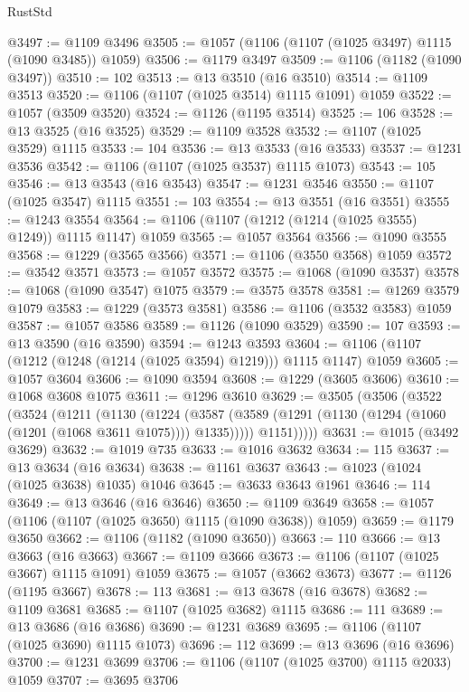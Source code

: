 \begin{lexlean}{RustStd}
\begin{coremodule}
@3497 := @1109 @3496
@3505 := @1057 (@1106 (@1107 (@1025 @3497) @1115 (@1090 @3485)) @1059)
@3506 := @1179 @3497
@3509 := @1106 (@1182 (@1090 @3497))
@3510 := 102
@3513 := @13 @3510 (@16 @3510)
@3514 := @1109 @3513
@3520 := @1106 (@1107 (@1025 @3514) @1115 @1091) @1059
@3522 := @1057 (@3509 @3520)
@3524 := @1126 (@1195 @3514)
@3525 := 106
@3528 := @13 @3525 (@16 @3525)
@3529 := @1109 @3528
@3532 := @1107 (@1025 @3529) @1115
@3533 := 104
@3536 := @13 @3533 (@16 @3533)
@3537 := @1231 @3536
@3542 := @1106 (@1107 (@1025 @3537) @1115 @1073)
@3543 := 105
@3546 := @13 @3543 (@16 @3543)
@3547 := @1231 @3546
@3550 := @1107 (@1025 @3547) @1115
@3551 := 103
@3554 := @13 @3551 (@16 @3551)
@3555 := @1243 @3554
@3564 := @1106 (@1107 (@1212 (@1214 (@1025 @3555) @1249)) @1115 @1147) @1059
@3565 := @1057 @3564
@3566 := @1090 @3555
@3568 := @1229 (@3565 @3566)
@3571 := @1106 (@3550 @3568) @1059
@3572 := @3542 @3571
@3573 := @1057 @3572
@3575 := @1068 (@1090 @3537)
@3578 := @1068 (@1090 @3547) @1075
@3579 := @3575 @3578
@3581 := @1269 @3579 @1079
@3583 := @1229 (@3573 @3581)
@3586 := @1106 (@3532 @3583) @1059
@3587 := @1057 @3586
@3589 := @1126 (@1090 @3529)
@3590 := 107
@3593 := @13 @3590 (@16 @3590)
@3594 := @1243 @3593
@3604 := @1106 (@1107 (@1212 (@1248 (@1214 (@1025 @3594) @1219))) @1115 @1147) @1059
@3605 := @1057 @3604
@3606 := @1090 @3594
@3608 := @1229 (@3605 @3606)
@3610 := @1068 @3608 @1075
@3611 := @1296 @3610
@3629 := @3505
    (@3506
      (@3522
        (@3524
          (@1211
            (@1130
              (@1224
                (@3587 (@3589 (@1291 (@1130 (@1294 (@1060 (@1201 (@1068 @3611 @1075)))) @1335)))))
              @1151)))))
@3631 := @1015 (@3492 @3629)
@3632 := @1019 @735
@3633 := @1016 @3632
@3634 := 115
@3637 := @13 @3634 (@16 @3634)
@3638 := @1161 @3637
@3643 := @1023 (@1024 (@1025 @3638) @1035) @1046
@3645 := @3633 @3643 @1961
@3646 := 114
@3649 := @13 @3646 (@16 @3646)
@3650 := @1109 @3649
@3658 := @1057 (@1106 (@1107 (@1025 @3650) @1115 (@1090 @3638)) @1059)
@3659 := @1179 @3650
@3662 := @1106 (@1182 (@1090 @3650))
@3663 := 110
@3666 := @13 @3663 (@16 @3663)
@3667 := @1109 @3666
@3673 := @1106 (@1107 (@1025 @3667) @1115 @1091) @1059
@3675 := @1057 (@3662 @3673)
@3677 := @1126 (@1195 @3667)
@3678 := 113
@3681 := @13 @3678 (@16 @3678)
@3682 := @1109 @3681
@3685 := @1107 (@1025 @3682) @1115
@3686 := 111
@3689 := @13 @3686 (@16 @3686)
@3690 := @1231 @3689
@3695 := @1106 (@1107 (@1025 @3690) @1115 @1073)
@3696 := 112
@3699 := @13 @3696 (@16 @3696)
@3700 := @1231 @3699
@3706 := @1106 (@1107 (@1025 @3700) @1115 @2033) @1059
@3707 := @3695 @3706

\end{coremodule}
\end{lexlean}
